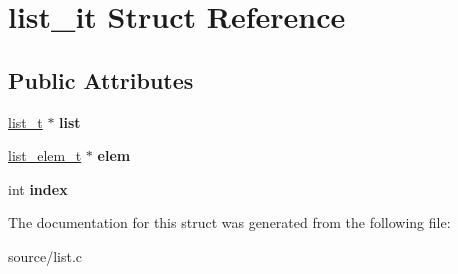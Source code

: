 \hypertarget{structlist__it}{}\section{list\+\_\+it Struct Reference}
\label{structlist__it}
\subsection*{Public Attributes}
\begin{DoxyCompactItemize}
\item 
\hyperlink{list_8h_a15376354e4e8b4f1732e9df17f30786c}{list\+\_\+t} $\ast$ {\bfseries list}\hypertarget{structlist__it_a69820ab0c7cc887f474e6e01cce114db}{}\label{structlist__it_a69820ab0c7cc887f474e6e01cce114db}

\item 
\hyperlink{structlist__element}{list\+\_\+elem\+\_\+t} $\ast$ {\bfseries elem}\hypertarget{structlist__it_a1bae8e58e884db0bc9061b4b0995ce4e}{}\label{structlist__it_a1bae8e58e884db0bc9061b4b0995ce4e}

\item 
int {\bfseries index}\hypertarget{structlist__it_af23cde7c962c916f6c380145de361f9a}{}\label{structlist__it_af23cde7c962c916f6c380145de361f9a}

\end{DoxyCompactItemize}


The documentation for this struct was generated from the following file\+:\begin{DoxyCompactItemize}
\item 
source/list.\+c\end{DoxyCompactItemize}
